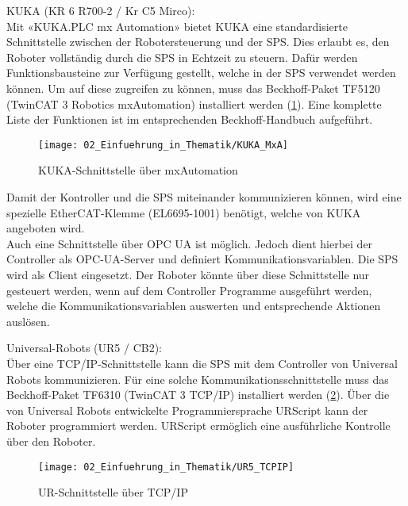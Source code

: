 		KUKA (KR 6 R700-2 / Kr C5 Mirco):
		\vspace{2mm}
		\\
		Mit «KUKA.PLC mx Automation» bietet KUKA eine standardisierte Schnittstelle zwischen der Robotersteuerung und der SPS. Dies erlaubt es, den Roboter vollständig durch die SPS in Echtzeit zu steuern. Dafür werden Funktionsbausteine zur Verfügung gestellt, welche in der SPS verwendet werden können. Um auf diese zugreifen zu können, muss das Beckhoff-Paket TF5120 (TwinCAT 3 Robotics mxAutomation) installiert werden (\ref{fig:KUKA_mxA}). Eine komplette Liste der Funktionen ist im entsprechenden Beckhoff-Handbuch aufgeführt.
		
		\begin{figure}[h!]
			\centering
			\texttt{[image: 02\_Einfuehrung\_in\_Thematik/KUKA\_MxA]}
			\captionsetup{justification=centering}
			\caption{KUKA-Schnittstelle über mxAutomation}
			\label{fig:KUKA_mxA}
		\end{figure}
		
		\newpage
		
		Damit der Kontroller und die SPS miteinander kommunizieren können, wird eine spezielle EtherCAT-Klemme (EL6695-1001) benötigt, welche von KUKA angeboten wird. 
		\\
		Auch eine Schnittstelle über OPC UA ist möglich. Jedoch dient hierbei der Controller als OPC-UA-Server und definiert Kommunikationsvariablen. Die SPS wird als Client eingesetzt. Der Roboter könnte über diese Schnittstelle nur gesteuert werden, wenn auf dem Controller Programme ausgeführt werden, welche die Kommunikationsvariablen auswerten und entsprechende Aktionen auslösen. 
		\vspace{3mm}
		
		Universal-Robots (UR5 / CB2):
		\vspace{2mm}
		\\
		Über eine TCP/IP-Schnittstelle kann die SPS mit dem Controller von Universal Robots kommunizieren. Für eine solche Kommunikationsschnittstelle muss das Beckhoff-Paket TF6310 (TwinCAT 3 TCP/IP) installiert werden (\ref{fig:UR_TCPIP}). Über die von Universal Robots entwickelte Programmiersprache URScript kann der Roboter programmiert werden. URScript ermöglich eine ausführliche Kontrolle über den Roboter.
		
		\begin{figure}[h!]
			\centering
			\texttt{[image: 02\_Einfuehrung\_in\_Thematik/UR5\_TCPIP]}
			\captionsetup{justification=centering}
			\caption{UR-Schnittstelle über TCP/IP}
			\label{fig:UR_TCPIP}
		\end{figure}
	
